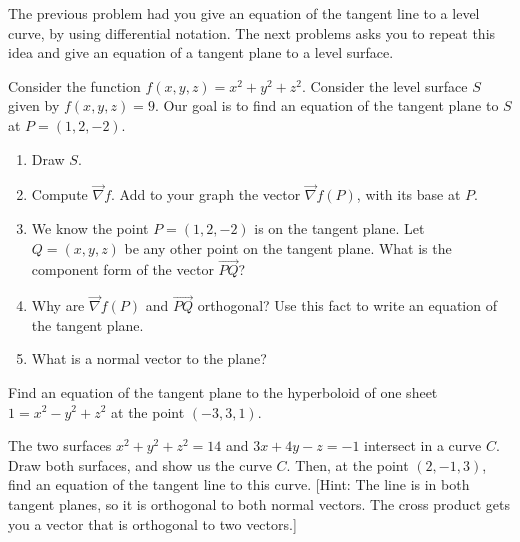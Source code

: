 The previous problem had you give an equation of the tangent line to a level curve, by using differential notation.  The next problems asks you to repeat this idea and give an equation of a tangent plane to a level surface.
\begin{problem}
 Consider the function $f(x,y,z)=x^2+y^2+z^2$.  Consider the level surface $S$ given by $f(x,y,z)=9$. Our goal is to find an equation of the tangent plane to $S$ at $P=(1,2,-2)$.
 \begin{enumerate}
  \item Draw $S$.
  \item Compute $\vec \nabla f$. Add to your graph the vector $\vec \nabla f(P)$, with its base at $P$. 
  \item We know the point $P=(1,2,-2)$ is on the tangent plane. Let $Q=(x,y,z)$ be any other point on the tangent plane.  What is the component form of the vector $\vec {PQ}$?
  \item Why are  $\vec \nabla f(P)$ and $\vec{PQ}$ orthogonal? Use this fact to write an equation of the tangent plane.
  \item What is a normal vector to the plane?
 \end{enumerate}
\end{problem}

\begin{problem}
 Find an equation of the tangent plane to the hyperboloid of one sheet $1=x^2-y^2+z^2$ at the point $(-3,3,1)$. 
\end{problem}

\begin{problem}
 The two surfaces $x^2+y^2+z^2=14$ and $3x+4y-z=-1$ intersect in a curve $C$. Draw both surfaces, and show us the curve $C$. Then, at the point $(2,-1,3)$, find an equation of the tangent line to this curve. [Hint: The line is in both tangent planes, so it is orthogonal to both normal vectors. The cross product gets you a vector that is orthogonal to two vectors.]
\end{problem}

